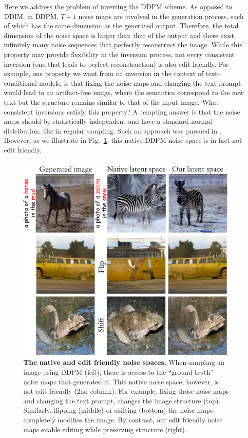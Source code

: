 Here we address the problem of inverting the DDPM scheme. As opposed to DDIM, in DDPM, $T+1$ noise maps are involved in the generation process, each of which has the same dimension as the generated output. Therefore, the total dimension of the noise space is larger than that of the output and there exist infinitely many noise sequences that perfectly reconstruct the image. While this property may provide flexibility in the inversion process, not every consistent inversion (\ie one that leads to perfect reconstruction) is also edit friendly. For example, one property we want from an inversion in the context of text-conditional models, is that fixing the noise maps and changing the text-prompt would lead to an artifact-free image, where the semantics correspond to the new text but the structure remains similar to that of the input image. What consistent inversions satisfy this property? A tempting answer is that the noise maps should be statistically independent and have a standard normal distribution, like in regular sampling. Such an approach was pursued in \cite{Wu22}. However, as we illustrate in Fig.~\ref{fig:generated_vs_us}, this native DDPM noise space is in fact not edit friendly. 

\begin{figure}
\centering
\includegraphics[width=\columnwidth]{ICCV23_submission/figures/generated_vs_us.pdf}
\caption{\textbf{The native and edit friendly noise spaces.} When sampling an image using DDPM (left), there is access to the ``ground truth'' noise maps that generated it. This native noise space, however, is not edit friendly (2nd column). For example, fixing those noise maps and changing the text prompt, changes the image structure (top). Similarly, flipping (middle) or shifting (bottom) the noise maps completely modifies the image. By contrast, our edit friendly noise maps enable editing while preserving structure (right).
}
\label{fig:generated_vs_us}
\end{figure}


